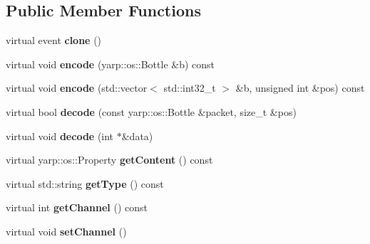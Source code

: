 \subsection*{Public Member Functions}
\begin{DoxyCompactItemize}
\item 
virtual event {\bfseries clone} ()\hypertarget{classev_1_1vEvent_a44f88f43a5c6b5aa6d93001a11f9309b}{}\label{classev_1_1vEvent_a44f88f43a5c6b5aa6d93001a11f9309b}

\item 
virtual void {\bfseries encode} (yarp\+::os\+::\+Bottle \&b) const \hypertarget{classev_1_1vEvent_a66d9e4d833031c146cc0ac3af332b1cc}{}\label{classev_1_1vEvent_a66d9e4d833031c146cc0ac3af332b1cc}

\item 
virtual void {\bfseries encode} (std\+::vector$<$ std\+::int32\+\_\+t $>$ \&b, unsigned int \&pos) const \hypertarget{classev_1_1vEvent_a06adb6ff0f3d7a09ace61597093bf73b}{}\label{classev_1_1vEvent_a06adb6ff0f3d7a09ace61597093bf73b}

\item 
virtual bool {\bfseries decode} (const yarp\+::os\+::\+Bottle \&packet, size\+\_\+t \&pos)\hypertarget{classev_1_1vEvent_a86e3212efa43423bff4c2bf25434066f}{}\label{classev_1_1vEvent_a86e3212efa43423bff4c2bf25434066f}

\item 
virtual void {\bfseries decode} (int $\ast$\&data)\hypertarget{classev_1_1vEvent_a743d608be2136b3338aeeadabbd92300}{}\label{classev_1_1vEvent_a743d608be2136b3338aeeadabbd92300}

\item 
virtual yarp\+::os\+::\+Property {\bfseries get\+Content} () const \hypertarget{classev_1_1vEvent_adabb906a71f96c89d6d539c899044622}{}\label{classev_1_1vEvent_adabb906a71f96c89d6d539c899044622}

\item 
virtual std\+::string {\bfseries get\+Type} () const \hypertarget{classev_1_1vEvent_a90411228dd74d994854b501b7cae7ff1}{}\label{classev_1_1vEvent_a90411228dd74d994854b501b7cae7ff1}

\item 
virtual int {\bfseries get\+Channel} () const \hypertarget{classev_1_1vEvent_a8ddb67938981d00a7275417e511ad3a5}{}\label{classev_1_1vEvent_a8ddb67938981d00a7275417e511ad3a5}

\item 
virtual void {\bfseries set\+Channel} ()\hypertarget{classev_1_1vEvent_a2cf5bf1d01ad2757a82b6e07d7e2a5da}{}\label{classev_1_1vEvent_a2cf5bf1d01ad2757a82b6e07d7e2a5da}

\end{DoxyCompactItemize}
